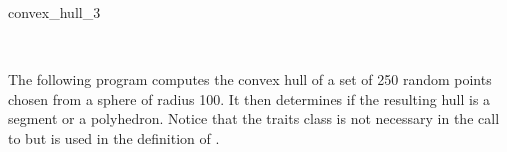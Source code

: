 \begin{ccRefFunction}{convex_hull_3}
\ccSeeAlso

  \\

\ccExample

The following program computes the convex hull of a set of 250 random
points chosen from a sphere of radius 100.  It then determines if the resulting
hull is a segment or a polyhedron.  Notice that the traits class is not
necessary in the call to  but is used in the definition
of .


\end{ccRefFunction}
